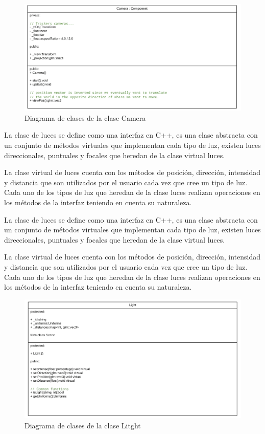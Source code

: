 \documentclass[a4paper, 17pt]{book}
\begin{document}
\begin{figure}[hbt!]
    \centering
    \includegraphics[scale=0.2, keepaspectratio]{img/Camera.png}
    \caption{Diagrama de clases de la clase Camera}
    \label{figura:Component}
\end{figure}

La clase de luces se define como una interfaz en C++, es una clase abstracta con un conjunto de métodos virtuales que implementan cada
tipo de luz, existen luces direccionales, puntuales y focales que heredan de la clase virtual luces.

La clase virtual de luces cuenta con los métodos de posición, dirección, intensidad y distancia que son utilizados por el usuario cada
vez que cree un tipo de luz. Cada uno de los tipos de luz que heredan de la clase luces realizan operaciones en los métodos de la
interfaz teniendo en cuenta su naturaleza.

La clase de luces se define como una interfaz en C++, es una clase abstracta con un conjunto de métodos virtuales que implementan cada tipo
de luz, existen luces direccionales, puntuales y focales que heredan de la clase virtual luces.

La clase virtual de luces cuenta con los métodos de posición, dirección, intensidad y distancia que son utilizados por el usuario cada
vez que cree un tipo de luz. Cada uno de los tipos de luz que heredan de la clase luces realizan operaciones en los métodos de la
interfaz teniendo en cuenta su naturaleza.

\begin{figure}[hbt!]
    \centering
    \includegraphics[scale=0.08, keepaspectratio]{img/Litght.png}
    \caption{Diagrama de clases de la clase Litght}
    \label{figura:Component}
\end{figure}
\end{document}
